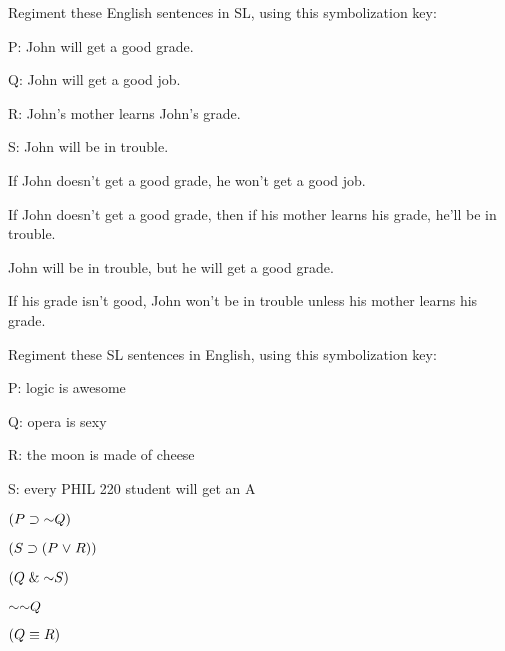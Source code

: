 \problempart
\label{HW2.C}
Regiment these English sentences in SL, using this symbolization key:
\begin{ekey}
\item[P:] John will get a good grade.
\item[Q:] John will get a good job.
\item[R:] John's mother learns John's grade.
\item[S:] John will be in trouble.
\end{ekey}
	\begin{earg}
		\item If John doesn’t get a good grade, he won’t get a good job.
		\item If John doesn’t get a good grade, then if his mother learns his grade, he’ll be in
trouble.
		\item John will be in trouble, but he will get a good grade.
		\item If his grade isn't good, John won't be in trouble unless his mother learns his grade.
	\end{earg}

	
\problempart
\label{HW2.D}

Regiment these SL sentences in English, using this symbolization key:
\begin{ekey}
\item[P:] logic is awesome
\item[Q:] opera is sexy
\item[R:] the moon is made of cheese
\item[S:] every PHIL 220 student will get an A
\end{ekey}
	\begin{earg}
		\item $(P \eif \enot Q)$
		\item $(S \supset (P \mkern1mu\vee\mkern1mu R))$
		\item $(Q \eand \enot S)$
		\item $\enot \enot Q$
		\item $(Q \equiv R)$
	\end{earg}
	
